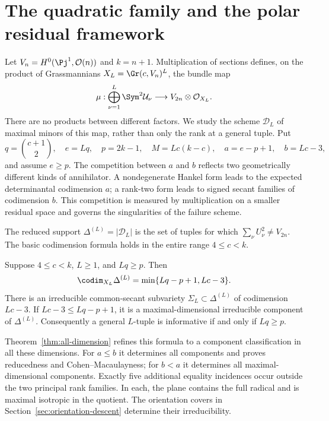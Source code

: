 \section{The quadratic family and the polar residual framework}
\label{sec:introduction}
Let $V_n=H^0(\Pj^1,\mathcal O(n))$ and $k=n+1$. Multiplication
of sections defines, on the product of Grassmannians
$X_L=\Gr(c,V_n)^L$, the bundle map
\begin{equation}\label{eq:intro-multiplication}
 \mu:\bigoplus_{\nu=1}^L\Sym^2\mathcal U_\nu
           \longrightarrow V_{2n}\otimes\mathcal O_{X_L}.
\end{equation}
There are no products between different factors. We study the scheme
$\mathscr D_L$ of maximal minors of this map, rather than only the
rank at a general tuple. Put
\[
 q=\binom{c+1}{2},\quad e=Lq,\quad p=2k-1,\quad
 M=Lc(k-c),\quad a=e-p+1,\quad b=Lc-3,
\]
and assume $e\ge p$. The competition between $a$ and $b$ reflects
two geometrically different kinds of annihilator. A nondegenerate
Hankel form leads to the expected determinantal codimension $a$;
a rank-two form leads to signed secant families of codimension $b$.
This competition is measured by multiplication on a smaller residual
space and governs the singularities of the failure scheme.

The reduced support $\Delta^{(L)}=|\mathscr D_L|$ is the set of
tuples for which $\sum_\nu U_\nu^2\ne V_{2n}$. The basic
codimension formula holds in the entire range $4\le c<k$.
\begin{theorem}\label{thm:global-intro}
Suppose $4\le c<k$, $L\ge1$, and $Lq\ge p$. Then
\begin{equation}\label{eq:codimension}
 \codim_{X_L}\Delta^{(L)}=\min\{Lq-p+1,Lc-3\}.
\end{equation}
There is an irreducible common-secant subvariety $\Sigma_L\subset\Delta^{(L)}$ of codimension $Lc-3$. If $Lc-3\le Lq-p+1$, it is a maximal-dimensional irreducible component of $\Delta^{(L)}$. Consequently a general $L$-tuple is informative if and only if $Lq\ge p$.
\end{theorem}

Theorem~\ref{thm:all-dimension} refines this formula to a component
classification in all these dimensions. For $a\le b$ it determines
all components and proves reducedness and Cohen--Macaulayness; for
$b<a$ it determines all maximal-dimensional components. Exactly five
additional equality incidences occur outside the two principal rank
families. In each, the plane contains the full radical and is maximal
isotropic in the quotient. The orientation covers in
Section~\ref{sec:orientation-descent} determine their irreducibility.

